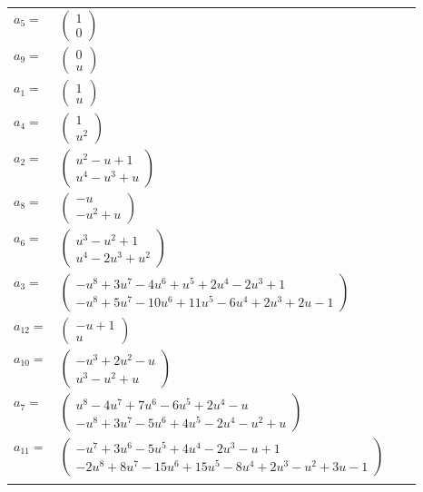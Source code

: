 \documentclass[1p]{elsarticle_modified}
\theoremstyle{definition}
\begin{document}
\begin{tabular}{m{7pt} m{180pt} m{7pt} m{180pt} }
\flushright $a_{5}=$&$\begin{pmatrix}1\\0\end{pmatrix}$ \\
\flushright $a_{9}=$&$\begin{pmatrix}0\\u\end{pmatrix}$ \\
\flushright $a_{1}=$&$\begin{pmatrix}1\\u\end{pmatrix}$ \\
\flushright $a_{4}=$&$\begin{pmatrix}1\\u^2\end{pmatrix}$ \\
\flushright $a_{2}=$&$\begin{pmatrix}u^2- u+1\\u^4- u^3+u\end{pmatrix}$ \\
\flushright $a_{8}=$&$\begin{pmatrix}- u\\- u^2+u\end{pmatrix}$ \\
\flushright $a_{6}=$&$\begin{pmatrix}u^3- u^2+1\\u^4-2 u^3+u^2\end{pmatrix}$ \\
\flushright $a_{3}=$&$\begin{pmatrix}- u^8+3 u^7-4 u^6+u^5+2 u^4-2 u^3+1\\- u^8+5 u^7-10 u^6+11 u^5-6 u^4+2 u^3+2 u-1\end{pmatrix}$ \\
\flushright $a_{12}=$&$\begin{pmatrix}- u+1\\u\end{pmatrix}$ \\
\flushright $a_{10}=$&$\begin{pmatrix}- u^3+2 u^2- u\\u^3- u^2+u\end{pmatrix}$ \\
\flushright $a_{7}=$&$\begin{pmatrix}u^8-4 u^7+7 u^6-6 u^5+2 u^4- u\\- u^8+3 u^7-5 u^6+4 u^5-2 u^4- u^2+u\end{pmatrix}$ \\
\flushright $a_{11}=$&$\begin{pmatrix}- u^7+3 u^6-5 u^5+4 u^4-2 u^3- u+1\\-2 u^8+8 u^7-15 u^6+15 u^5-8 u^4+2 u^3- u^2+3 u-1\end{pmatrix}$\\&\end{tabular}
\end{document}
